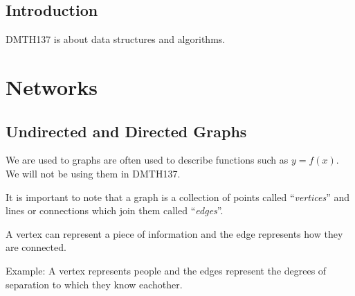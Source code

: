 %
\maketitle
%
%
\section{Introduction}
\label{sec:Introduction}
DMTH137 is about data structures and algorithms.
\tableofcontents
%
\newpage

\chapter{Networks}
\label{chap:Networks}
\section{Undirected and Directed Graphs}
\label{sec:UndirectedAndDirectedGraphs}

We are used to graphs are often used to describe functions such as $y = f(x)$.
We will not be using them in DMTH137.

It is important to note that a graph is a collection of points
called ``\emph{vertices}'' and lines or connections which join them called
``\emph{edges}''.

A vertex can represent a piece of information and the edge represents how they
are connected.

Example: A vertex represents people and the edges represent the degrees of
separation to which they know eachother.

